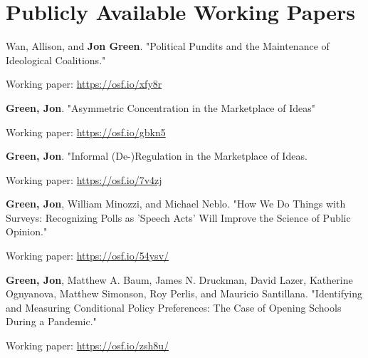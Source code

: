 \documentclass[letterpaper]{article}
\renewenvironment{itemize}{
  \begin{list}{}{
    \setlength{\leftmargin}{1.5em}
  }
}{
  \end{list}
}
\begin{document}




\section*{Publicly Available Working Papers}

\begin{itemize}

\item Wan, Allison, and \textbf{Jon Green}. "Political Pundits and the Maintenance of Ideological Coalitions."
\begin{itemize}
\item Working paper: \url{https://osf.io/xfy8r}
\end{itemize}

\item \textbf{Green, Jon}. "Asymmetric Concentration in the Marketplace of Ideas"
\begin{itemize}
\item Working paper: \url{https://osf.io/gbkn5}
\end{itemize}

\item \textbf{Green, Jon}. "Informal (De-)Regulation in the Marketplace of Ideas.
\begin{itemize}
\item Working paper: \url{https://osf.io/7v4zj}
\end{itemize}

\item \textbf{Green, Jon}, William Minozzi, and Michael Neblo. "How We Do Things with Surveys: Recognizing Polls as 'Speech Acts' Will Improve the Science of Public Opinion." 
\begin{itemize}
\item Working paper: \url{https://osf.io/54ysv/}
\end{itemize}

\item  \textbf{Green, Jon}, Matthew A. Baum, James N. Druckman, David Lazer, Katherine Ognyanova, Matthew Simonson, Roy Perlis, and Mauricio Santillana. "Identifying and Measuring Conditional Policy Preferences: The Case of Opening Schools During a Pandemic." 
\begin{itemize}
\item Working paper: \url{https://osf.io/zsh8u/}
\end{itemize}


\end{itemize}
\end{document}
